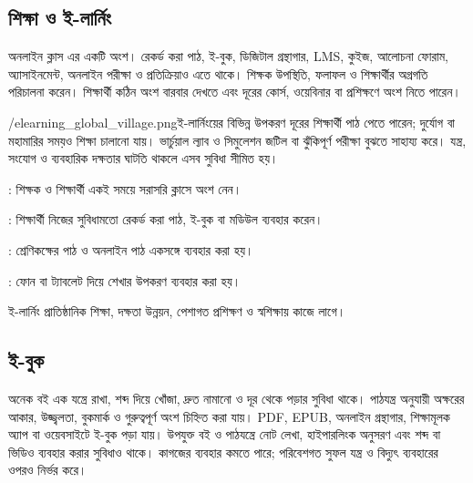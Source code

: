 \begin{topicbody}
\subsection{শিক্ষা ও ই-লার্নিং}
অনলাইন ক্লাস এর একটি অংশ। রেকর্ড করা পাঠ, ই-বুক, ডিজিটাল গ্রন্থাগার, LMS, কুইজ, আলোচনা ফোরাম, অ্যাসাইনমেন্ট, অনলাইন পরীক্ষা ও প্রতিক্রিয়াও এতে থাকে। শিক্ষক উপস্থিতি, ফলাফল ও শিক্ষার্থীর অগ্রগতি পরিচালনা করেন। শিক্ষার্থী কঠিন অংশ বারবার দেখতে এবং দূরের কোর্স, ওয়েবিনার বা প্রশিক্ষণে অংশ নিতে পারেন।
\begin{rightimageblock}{\chaponeimg/elearning_global_village.png}{ই-লার্নিংয়ের বিভিন্ন উপকরণ}
দূরের শিক্ষার্থী পাঠ পেতে পারেন; দুর্যোগ বা মহামারির সময়ও শিক্ষা চালানো যায়। ভার্চুয়াল ল্যাব ও সিমুলেশন জটিল বা ঝুঁকিপূর্ণ পরীক্ষা বুঝতে সাহায্য করে। যন্ত্র, সংযোগ ও ব্যবহারিক দক্ষতার ঘাটতি থাকলে এসব সুবিধা সীমিত হয়।
\end{rightimageblock}\label{fig:ch1-pair-8}
\begin{compactpoints}
\item {}: শিক্ষক ও শিক্ষার্থী একই সময়ে সরাসরি ক্লাসে অংশ নেন।
\item {}: শিক্ষার্থী নিজের সুবিধামতো রেকর্ড করা পাঠ, ই-বুক বা মডিউল ব্যবহার করেন।
\item {}: শ্রেণিকক্ষের পাঠ ও অনলাইন পাঠ একসঙ্গে ব্যবহার করা হয়।
\item {}: ফোন বা ট্যাবলেট দিয়ে শেখার উপকরণ ব্যবহার করা হয়।
\end{compactpoints}
ই-লার্নিং প্রাতিষ্ঠানিক শিক্ষা, দক্ষতা উন্নয়ন, পেশাগত প্রশিক্ষণ ও স্বশিক্ষায় কাজে লাগে।

\subsection{ই-বুক}
অনেক বই এক যন্ত্রে রাখা, শব্দ দিয়ে খোঁজা, দ্রুত নামানো ও দূর থেকে পড়ার সুবিধা থাকে। পাঠযন্ত্র অনুযায়ী অক্ষরের আকার, উজ্জ্বলতা, বুকমার্ক ও গুরুত্বপূর্ণ অংশ চিহ্নিত করা যায়। PDF, EPUB, অনলাইন গ্রন্থাগার, শিক্ষামূলক অ্যাপ বা ওয়েবসাইটে ই-বুক পড়া যায়। উপযুক্ত বই ও পাঠযন্ত্রে নোট লেখা, হাইপারলিংক অনুসরণ এবং শব্দ বা ভিডিও ব্যবহার করার সুবিধাও থাকে। কাগজের ব্যবহার কমতে পারে; পরিবেশগত সুফল যন্ত্র ও বিদ্যুৎ ব্যবহারের ওপরও নির্ভর করে।


\end{topicbody}
